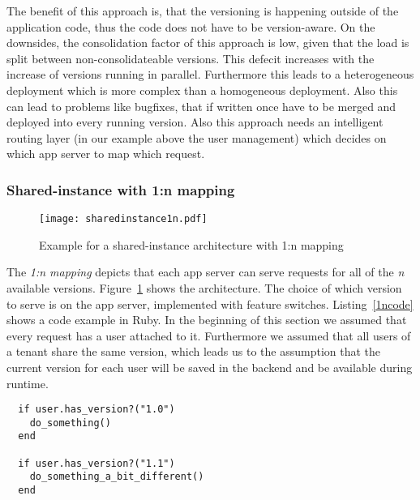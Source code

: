 The benefit of this approach is, that the versioning is happening outside of the application code, thus the code does not have to be version-aware. On the downsides, the consolidation factor of this approach is low, given that the load is split between non-consolidateable versions. This defecit increases with the increase of versions running in parallel. Furthermore this leads to a heterogeneous deployment which is more complex than a homogeneous deployment.  Also this can lead to problems like bugfixes, that if written once have to be merged and deployed into every running version. Also this approach needs an intelligent routing layer (in our example above the user management) which decides on which app server to map which request.

%
%

\subsubsection{Shared-instance with 1:n mapping}

\begin{figure}
\centering
\texttt{[image: sharedinstance1n.pdf]}
\caption{Example for a shared-instance architecture with 1:n mapping}
\label{fig:sharedinstance1n}
\end{figure}

The \emph{1:n mapping} depicts that each app server can serve requests for all of the \emph{n} available versions. Figure~\ref{fig:sharedinstance1n} shows the architecture. The choice of which version to serve is on the app server, implemented with feature switches. Listing~\ref{1ncode} shows a code example in Ruby. In the beginning of this section we assumed that every request has a user attached to it. Furthermore we assumed that all users of a tenant share the same version, which leads us to the assumption that the current version for each user will be saved in the backend and be available during runtime.

\begin{lstlisting}
  if user.has_version?("1.0")
    do_something()
  end

  if user.has_version?("1.1")
    do_something_a_bit_different()
  end
\end{lstlisting}

